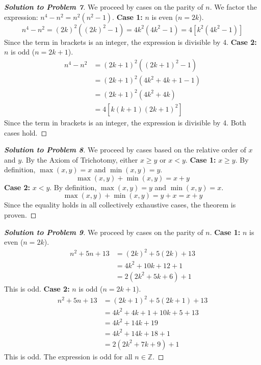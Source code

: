 \documentclass[11pt]{article}
\begin{document}
\begin{proof}[\textbf{Solution to Problem 7}]
We proceed by cases on the parity of $n$. We factor the expression: $n^4 - n^2 = n^2(n^2 - 1)$.
\textbf{Case 1:} $n$ is even ($n = 2k$).
\[ n^4 - n^2 = (2k)^2((2k)^2 - 1) = 4k^2(4k^2 - 1) = 4[k^2(4k^2 - 1)] \]
Since the term in brackets is an integer, the expression is divisible by 4.
\textbf{Case 2:} $n$ is odd ($n = 2k + 1$).
\begin{align*}
n^4 - n^2 &= (2k+1)^2((2k+1)^2 - 1) \\
&= (2k+1)^2(4k^2 + 4k + 1 - 1) \\
&= (2k+1)^2(4k^2 + 4k) \\
&= 4[k(k+1)(2k+1)^2]
\end{align*}
Since the term in brackets is an integer, the expression is divisible by 4. Both cases hold.
\end{proof}

\begin{proof}[\textbf{Solution to Problem 8}]
We proceed by cases based on the relative order of $x$ and $y$. By the Axiom of Trichotomy, either $x \ge y$ or $x < y$.
\textbf{Case 1:} $x \ge y$.
By definition, $\max(x, y) = x$ and $\min(x, y) = y$.
\[ \max(x, y) + \min(x, y) = x + y \]
\textbf{Case 2:} $x < y$.
By definition, $\max(x, y) = y$ and $\min(x, y) = x$.
\[ \max(x, y) + \min(x, y) = y + x = x + y \]
Since the equality holds in all collectively exhaustive cases, the theorem is proven.
\end{proof}

\begin{proof}[\textbf{Solution to Problem 9}]
We proceed by cases on the parity of $n$.
\textbf{Case 1:} $n$ is even ($n = 2k$).
\begin{align*}
n^2 + 5n + 13 &= (2k)^2 + 5(2k) + 13 \\
&= 4k^2 + 10k + 12 + 1 \\
&= 2(2k^2 + 5k + 6) + 1
\end{align*}
This is odd.
\textbf{Case 2:} $n$ is odd ($n = 2k + 1$).
\begin{align*}
n^2 + 5n + 13 &= (2k+1)^2 + 5(2k+1) + 13 \\
&= 4k^2 + 4k + 1 + 10k + 5 + 13 \\
&= 4k^2 + 14k + 19 \\
&= 4k^2 + 14k + 18 + 1 \\
&= 2(2k^2 + 7k + 9) + 1
\end{align*}
This is odd. The expression is odd for all $n \in \mathbb{Z}$.
\end{proof}
\end{document}
